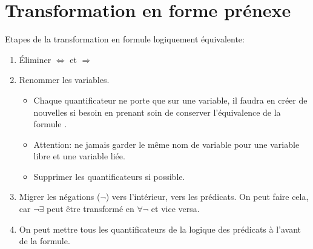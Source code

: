 {\section{Transformation en forme prénexe}

Etapes de la transformation en formule logiquement équivalente:
\begin{enumerate}
    \item Éliminer $\Leftrightarrow$ et $\Rightarrow$
    \item Renommer les variables. 
    \begin{itemize}
    \item Chaque quantificateur ne porte que sur une variable, il faudra en créer de nouvelles si besoin en prenant soin de conserver l'équivalence de la formule . 
    \item Attention: ne jamais garder le même nom de variable pour une variable libre et une variable liée. 
    \item Supprimer les quantificateurs si possible. \\
    \end{itemize}
    \item Migrer les négations ($\neg$) vers l'intérieur, vers les prédicats. On peut faire cela, car $\neg\exists$ peut être transformé en $\forall\neg$ et vice versa.  
    \item On peut mettre tous les quantificateurs de la logique des prédicats à l'avant de la formule. 
\end{enumerate}
}
